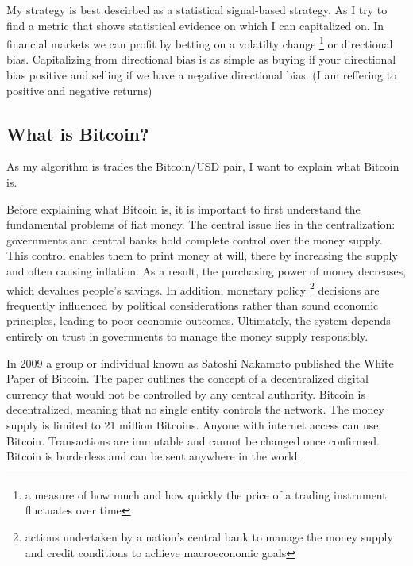 \documentclass[12pt]{article}
\begin{document}
My strategy is best descirbed as a statistical signal-based strategy. As I try to find a metric that shows statistical evidence on which I can capitalized on. In financial markets we can profit by betting on a volatilty change \footnote{a measure of how much and how quickly the price of a trading instrument fluctuates over time} or directional bias. Capitalizing from directional bias is as simple as buying if your directional bias positive and selling if we have a negative directional bias. (I am reffering to positive and negative returns)



















\newpage
\subsection{What is Bitcoin?}

As my algorithm is trades the Bitcoin/USD pair, I want to explain what Bitcoin is.

Before explaining what Bitcoin is, it is important to first understand the fundamental problems of fiat money. 
The central issue lies in the centralization: governments and central banks hold complete control over the money supply. This control enables them to print money at will, there by increasing the supply and often causing inflation. As a result, the purchasing power of money decreases, which devalues people’s savings. In addition, monetary policy \footnote{actions undertaken by a nation's central bank to manage the money supply and credit conditions to achieve macroeconomic goals} 
decisions are frequently influenced by political considerations rather than sound economic principles, leading to poor economic outcomes. Ultimately, the system depends entirely on trust in governments to manage the money supply responsibly.


In 2009 a group or individual known as Satoshi Nakamoto published the White Paper of Bitcoin. The paper outlines the concept of a decentralized digital currency that would not be controlled by any central authority. Bitcoin is decentralized, meaning that no single entity controls the network. The money supply is limited to 21 million Bitcoins. Anyone with internet access can use Bitcoin. Transactions are immutable and cannot be changed once confirmed. Bitcoin is borderless and can be sent anywhere in the world.
\end{document}

